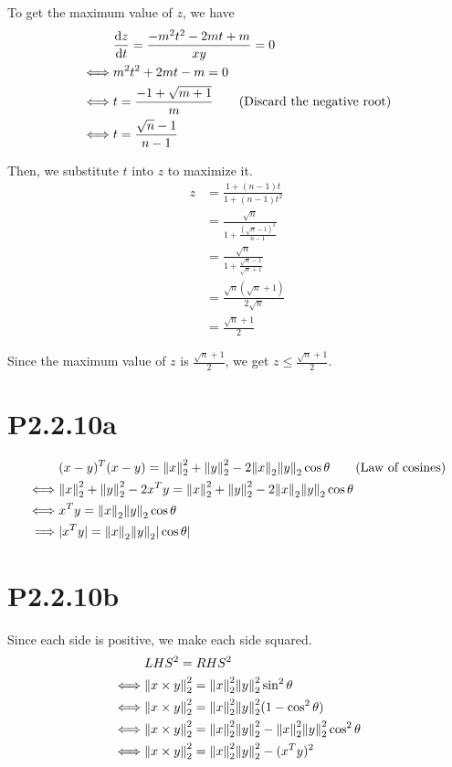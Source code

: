 \documentclass{article}
\begin{document}
To get the maximum value of $z$, we have
\begin{align*}
         & \dv{z}{t} = \frac{-m^2t^2-2mt+m}{xy} = 0                       \\
    \iff & m^2t^2+2mt-m=0                                                 \\
    \iff & t = \frac{-1+\sqrt{m+1}}{m} \tag*{(Discard the negative root)} \\
    \iff & t = \frac{\sqrt{n}-1}{n-1}
\end{align*}

Then, we substitute $t$ into $z$ to maximize it.
\begin{align*}
    z & = \frac{1+(n-1)t}{1+(n-1)t^2}                      \\
      & = \frac{\sqrt{n}}{1+\frac{(\sqrt{n}-1)^2}{n-1}}    \\
      & = \frac{\sqrt{n}}{1+\frac{\sqrt{n}-1}{\sqrt{n}+1}} \\
      & = \frac{\sqrt{n}(\sqrt{n}+1)}{2\sqrt{n}}           \\
      & = \frac{\sqrt{n}+1}{2}
\end{align*}

Since the maximum value of $z$ is $\frac{\sqrt{n}+1}{2}$,
we get $z \le \frac{\sqrt{n}+1}{2}$.

\section*{P2.2.10a}
\begin{align*}
             & (x-y)^T(x-y) = \norm{x}_2^2+\norm{y}_2^2-2\norm{x}_2\norm{y}_2\cos\theta \tag*{(Law of cosines)} \\
    \iff     & \norm{x}_2^2+\norm{y}_2^2-2x^Ty =\norm{x}_2^2+\norm{y}_2^2-2\norm{x}_2\norm{y}_2\cos\theta       \\
    \iff     & x^Ty = \norm{x}_2\norm{y}_2\cos\theta                                                            \\
    \implies & |x^Ty| = \norm{x}_2\norm{y}_2|\cos\theta|
\end{align*}

\section*{P2.2.10b}
Since each side is positive, we make each side squared.
\begin{align*}
         & LHS^2 = RHS^2                                                                          \\
    \iff & \norm{x\times y}_2^2 = \norm{x}_2^2\norm{y}_2^2\sin^2\theta                            \\
    \iff & \norm{x\times y}_2^2 = \norm{x}_2^2\norm{y}_2^2(1-\cos^2\theta)                        \\
    \iff & \norm{x\times y}_2^2 = \norm{x}_2^2\norm{y}_2^2 - \norm{x}_2^2\norm{y}_2^2\cos^2\theta \\
    \iff & \norm{x\times y}_2^2 = \norm{x}_2^2\norm{y}_2^2 - (x^Ty)^2
\end{align*}
\end{document}
